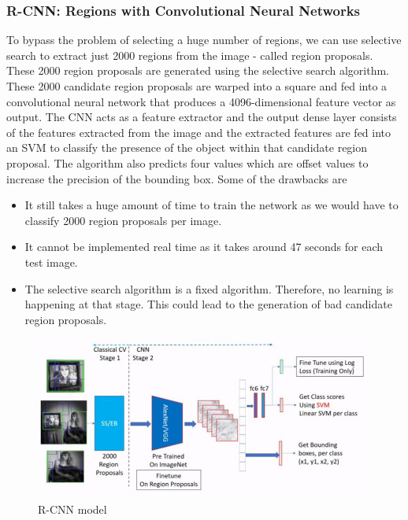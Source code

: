 \subsubsection{R-CNN: Regions with Convolutional Neural Networks}
To bypass the problem of selecting a huge number of regions, we can use selective search to extract just 2000 regions from the image - called region proposals. These 2000 region proposals are generated using the selective search algorithm. These 2000 candidate region proposals are warped into a square and fed into a convolutional neural network that produces a 4096-dimensional feature vector as output. The CNN acts as a feature extractor and the output dense layer consists of the features extracted from the image and the extracted features are fed into an SVM to classify the presence of the object within that candidate region proposal. The algorithm also predicts four values which are offset values to increase the precision of the bounding box. Some of the drawbacks are
\begin{itemize}
	\item It still takes a huge amount of time to train the network as we would have to classify 2000 region proposals per image.
	\item It cannot be implemented real time as it takes around 47 seconds for each test image.
	\item The selective search algorithm is a fixed algorithm. Therefore, no learning is happening at that stage. This could lead to the generation of bad candidate region proposals.
\end{itemize}

\begin{figure}[h!]
	\centering
	\includegraphics[width=0.9\linewidth]{Images/RCNN}
	\caption{R-CNN model}
	\label{fig:rcnn}
\end{figure}


